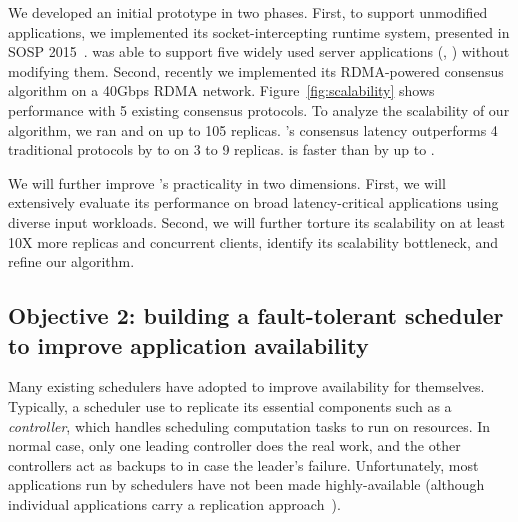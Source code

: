 
 We developed an \falcon initial prototype in two 
phases. First, to support unmodified applications, we implemented its 
socket-intercepting runtime system, presented in SOSP 2015~\cite{crane:sosp15}. 
\falcon was able to support five widely used server applications (\eg, \mysql) 
without modifying them. Second, recently we implemented its RDMA-powered 
consensus algorithm on a 40Gbps RDMA network. Figure~\ref{fig:scalability} 
shows \falcon performance with 5 existing consensus protocols. To analyze the 
scalability of our algorithm, we ran \falcon and \dare on up to 105 replicas. 
\falcon's consensus latency outperforms 4 traditional \paxos  protocols by 
\comptradlow to \comptradhigh on 3 to 9 replicas. \falcon is  faster than \dare 
by up to \fasterDARE.



 We will further improve \falcon's practicality in two 
dimensions. First, we will extensively evaluate its performance on broad 
latency-critical applications using diverse input workloads. Second, we will 
further torture its scalability on at least 10X more replicas and concurrent 
clients, identify its scalability bottleneck, and refine our algorithm. 

\vspace{-.15in}\subsection{Objective 2: 
building a fault-tolerant scheduler to improve 
application availability}\label{sec:scheduler}\vspace{-.075in}

Many existing schedulers have adopted \paxos to improve availability for 
themselves. Typically, a scheduler use \paxos to replicate its essential 
components such as a \emph{controller}, which handles scheduling computation 
tasks to run on resources. In normal case, only one leading controller does the 
real work, and the other controllers act as backups to in case the leader's 
failure. Unfortunately, most applications run by schedulers have not been 
made highly-available (although individual applications carry a replication 
approach~\cite{mapreduce,dolly:nsdi13}).

